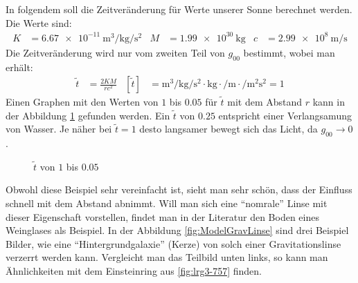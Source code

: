 \begin{refsection}
\begin{beispiel}
  In folgendem soll die Zeitveränderung für Werte unserer Sonne
  berechnet werden.  Die Werte sind:
  \begin{align*}
    K &= \SI{6.67e-11}{\meter\cubed\per\kilogram\per\second\squared}
    &M &= \SI{1.99e30}{\kilogram}
    &c &= \SI{2.99e8}{\meter\per\second}
  \end{align*}
  Die Zeitveränderung wird nur vom zweiten Teil von \(g_{00}\)
  bestimmt, wobei man erhält:
  \begin{align*}
    \tilde{t} &= \frac{2KM}{rc^2}
    &\left[\tilde{t}\right] &=
                              \si{\meter\cubed\per\kilogram\per\second\squared}
                              \cdot \si{\kilogram}
                              \cdot \si{\per\meter}
                              \cdot \si{\per\meter\squared\second\squared}
                              = 1
  \end{align*}
  Einen Graphen mit den Werten von \(1\) bis \(0.05\) für \(\tilde{t}\)
  mit dem Abstand \(r\) kann in der Abbildung \ref{fig:bsp1} gefunden
  werden.  Ein \(\tilde{t}\) von \(0.25\) entspricht einer
  Verlangsamung von Wasser.  Je näher bei \(\tilde{t}=1\) desto
  langsamer bewegt sich das Licht, da \(g_{00} \rightarrow 0\).
  \begin{figure}
    \centering
    
    \caption{\(\tilde{t}\) von \(1\) bis \(0.05\)}
    \label{fig:bsp1}
  \end{figure}
\end{beispiel}

Obwohl diese Beispiel sehr vereinfacht ist, sieht man sehr schön, dass
der Einfluss schnell mit dem Abstand abnimmt.  Will man sich eine
``nomrale'' Linse mit dieser Eigenschaft vorstellen, findet man in der
Literatur den Boden eines Weinglases als Beispiel.  In der Abbildung
\ref{fig:ModelGravLinse} sind drei Beispiel Bilder, wie eine
``Hintergrundgalaxie'' (Kerze) von solch einer Gravitationslinse
verzerrt werden kann.  Vergleicht man das Teilbild unten links, so
kann man Ähnlichkeiten mit dem Einsteinring aus \ref{fig:lrg3-757}
finden.


\end{refsection}
